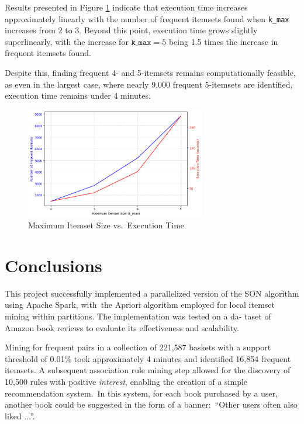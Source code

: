\documentclass{Class/julia}
\begin{document}
Results presented in Figure \ref{fig:k_max_vs_execution_time} indicate that execution time increases approximately linearly with the number of frequent itemsets found when \texttt{k\_max} increases from 2 to 3. Beyond this point, execution time grows slightly superlinearly, with the increase for \( \texttt{k\_max} = 5 \) being 1.5 times the increase in frequent itemsets found.

Despite this, finding frequent 4- and 5-itemsets remains computationally feasible, as even in the largest case, where nearly 9,000 frequent 5-itemsets are identified, execution time remains under 4 minutes.

\begin{figure}[!ht]
    \centering
    \includegraphics[width=0.7\textwidth]{k_max_vs_execution_time.png}
    \caption{Maximum Itemset Size vs.\ Execution Time}
    \label{fig:k_max_vs_execution_time}
\end{figure}

\section{Conclusions}\label{sec:5}

This project successfully implemented a parallelized version of the SON algorithm using Apache Spark, with~the Apriori algorithm employed for local itemset mining within partitions. The implementation was tested on a da- taset of Amazon book reviews to evaluate its effectiveness and scalability.

Mining for frequent pairs in a collection of 221,587 baskets with a support threshold of 0.01\% took approximately 4 minutes and identified 16,854 frequent itemsets. A subsequent association rule mining step allowed for the discovery of 10,500 rules with positive \textit{interest}, enabling the creation of a simple recommendation system.~In this system, for each book purchased by a user, another book could be suggested in the form of a banner:\ ``Other users often also liked ...''.
\end{document}
